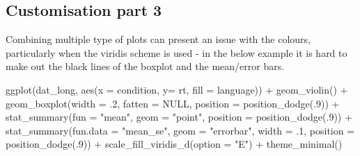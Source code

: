 \documentclass[
  english,
  doc,floatsintext]{apa6}
\newenvironment{Shaded}{\begin{snugshade}}{\end{snugshade}}
\newcommand{\AttributeTok}[1]{\textcolor[rgb]{0.77,0.63,0.00}{#1}}
\newcommand{\ConstantTok}[1]{\textcolor[rgb]{0.00,0.00,0.00}{#1}}
\newcommand{\DecValTok}[1]{\textcolor[rgb]{0.00,0.00,0.81}{#1}}
\newcommand{\FunctionTok}[1]{\textcolor[rgb]{0.00,0.00,0.00}{#1}}
\newcommand{\NormalTok}[1]{#1}
\newcommand{\SpecialCharTok}[1]{\textcolor[rgb]{0.00,0.00,0.00}{#1}}
\newcommand{\StringTok}[1]{\textcolor[rgb]{0.31,0.60,0.02}{#1}}
\begin{document}
\hypertarget{customisation-part-3}{%
\subsection{Customisation part 3}\label{customisation-part-3}}

Combining multiple type of plots can present an issue with the colours, particularly when the viridis scheme is used - in the below example it is hard to make out the black lines of the boxplot and the mean/error bars.

\begin{Shaded}
\begin{Highlighting}[]
\FunctionTok{ggplot}\NormalTok{(dat\_long, }\FunctionTok{aes}\NormalTok{(}\AttributeTok{x =}\NormalTok{ condition, }\AttributeTok{y=}\NormalTok{ rt, }\AttributeTok{fill =}\NormalTok{ language)) }\SpecialCharTok{+}
  \FunctionTok{geom\_violin}\NormalTok{() }\SpecialCharTok{+}
  \FunctionTok{geom\_boxplot}\NormalTok{(}\AttributeTok{width =}\NormalTok{ .}\DecValTok{2}\NormalTok{, }\AttributeTok{fatten =} \ConstantTok{NULL}\NormalTok{, }\AttributeTok{position =} \FunctionTok{position\_dodge}\NormalTok{(.}\DecValTok{9}\NormalTok{)) }\SpecialCharTok{+}
  \FunctionTok{stat\_summary}\NormalTok{(}\AttributeTok{fun =} \StringTok{"mean"}\NormalTok{, }\AttributeTok{geom =} \StringTok{"point"}\NormalTok{, }
               \AttributeTok{position =} \FunctionTok{position\_dodge}\NormalTok{(.}\DecValTok{9}\NormalTok{)) }\SpecialCharTok{+}
  \FunctionTok{stat\_summary}\NormalTok{(}\AttributeTok{fun.data =} \StringTok{"mean\_se"}\NormalTok{, }\AttributeTok{geom =} \StringTok{"errorbar"}\NormalTok{, }\AttributeTok{width =}\NormalTok{ .}\DecValTok{1}\NormalTok{,}
               \AttributeTok{position =} \FunctionTok{position\_dodge}\NormalTok{(.}\DecValTok{9}\NormalTok{)) }\SpecialCharTok{+}
  \FunctionTok{scale\_fill\_viridis\_d}\NormalTok{(}\AttributeTok{option =} \StringTok{"E"}\NormalTok{) }\SpecialCharTok{+}
  \FunctionTok{theme\_minimal}\NormalTok{()}
\end{Highlighting}
\end{Shaded}
\end{document}

